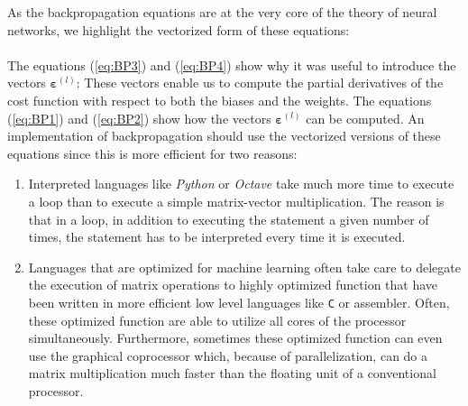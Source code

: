 As the backpropagation equations are at the very core of the theory of neural networks, we highlight the
vectorized form of these equations:
\\[0.2cm]
\hspace*{0.3cm}
\colorbox{red}{}
\\[0.2cm]
The equations (\ref{eq:BP3}) and (\ref{eq:BP4}) show why it was useful to introduce the
vectors $\boldsymbol{\varepsilon}^{(l)}$: These vectors enable us to compute the partial derivatives of the cost function
with respect to both the biases and the weights.  The equations (\ref{eq:BP1}) and (\ref{eq:BP2})
show how the vectors $\boldsymbol{\varepsilon}^{(l)}$ can be computed.  An implementation of backpropagation should use the vectorized
versions of these equations since this is more efficient for two reasons:
\begin{enumerate}
\item Interpreted languages like \textsl{Python} or \textsl{Octave} take much more time to
      execute a loop than to execute a simple matrix-vector multiplication.  The reason is that in a loop, in
      addition to executing the statement a given number of times, the statement has to be interpreted 
      every time it is executed.
\item Languages that are optimized for machine learning often take care to delegate the execution of matrix
      operations to highly optimized function that have been written in more efficient low level languages like
      \texttt{C} or assembler.  Often, these optimized function are able to utilize all cores of the processor
      simultaneously.  Furthermore, sometimes these optimized function can even use the graphical coprocessor
      which, because of parallelization,  can do a matrix multiplication much faster than the floating unit of
      a conventional processor.
\end{enumerate}

